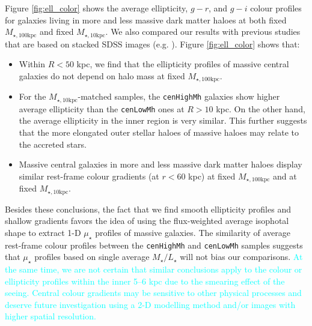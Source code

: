 \documentclass[a4paper,fleqn,usenatbib]{mnras}
\def\rbcg{\texttt{cenHighMh}}
\def\nbcg{\texttt{cenLowMh}}
\def\minn{{$M_{\star,10\mathrm{kpc}}$}}
\def\mtot{{$M_{\star,100\mathrm{kpc}}$}}
\def\m2l{{$M_{\star}/L_{\star}$}}
\def\mden{{$\mu_{\star}$}}
\newcommand{\song}[1]{\textcolor{cyan}{#1}}
\begin{document}
    Figure \ref{fig:ell_color} shows the average ellipticity, $g-r$, and $g-i$ colour 
    profiles for galaxies living in more and less massive dark matter haloes at both 
    fixed \mtot{} and fixed \minn{}. 
    We also compared our results with previous studies that are based on stacked SDSS 
    images (e.g. \citealt{LaBarbera2010, Tal2011, DSouza2014}). 
    Figure \ref{fig:ell_color} shows that: 
    
    \begin{itemize}
        \item Within $R<50$ kpc, we find that the ellipticity profiles of massive 
            central galaxies do not depend on halo mass at fixed \mtot{}.        
                
        \item For the \minn{}-matched samples, the \rbcg{} galaxies show higher
            average ellipticity than the \nbcg{} ones at $R > 10$ kpc. 
            On the other hand, the average ellipticity in the inner region is very 
            similar. 
            This further suggests that the more elongated outer stellar haloes 
            of massive haloes may relate to the accreted stars.
                     
        \item Massive central galaxies in more and less massive dark matter haloes 
            display similar rest-frame colour gradients (at $r<60$ kpc) at fixed 
            \mtot{} and at fixed  \minn{}.    
            
    \end{itemize}
    
    Besides these conclusions, the fact that we find smooth ellipticity profiles and 
    shallow gradients favors the idea of using the flux-weighted average isophotal 
    shape to extract 1-D \mden{} profiles of massive galaxies. 
    The similarity of average rest-frame colour profiles between the \rbcg{} and \nbcg{}
    samples suggests that \mden{} profiles based on single average \m2l{} will not bias 
    our comparisons. 
    \song{
    At the same time, we are not certain that similar conclusions apply to the 
    colour or ellipticity profiles within the inner 5--6 kpc due to the smearing effect
    of the seeing. 
    Central colour gradients may be sensitive to other physical processes and deserve 
    future investigation using a 2-D modelling method and/or images with higher spatial 
    resolution.
    }
    
   
\end{document}
